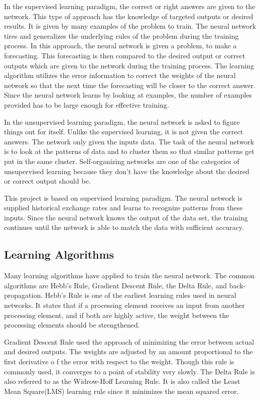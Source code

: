In the supervised learning paradigm, the correct or right answers are given to the network. This type of approach  has the  knowledge of targeted outputs or desired results. It is given by many examples of the problem to train. The neural network tires and generalizes the underlying rules of the problem  during the training process. In this approach, the neural network is given a problem, to make a forecasting. This forecasting is then compared to the desired output or correct outputs which are given to the network during the training process. The learning algorithm utilizes the error information to correct the weights of  the neural network so that the next time the forecasting will be closer to the correct answer. Since the neural network learns by looking at examples, the number of examples provided has to be large enough for effective training. 

In the unsupervised learning paradigm, the neural network is asked to figure things out for itself. Unlike the supervised learning, it is not given the correct answers. The network only given the inputs data.  The task of the neural network is to look at the patterns of data and to cluster them so that similar patterns get put in the same cluster. Self-organizing networks are one of the categories of unsupervised learning because they don't have the knowledge about the desired or correct output should be. 

This project  is based on supervised learning paradigm. The neural network is supplied historical exchange rates and learns to recognize patterns from these inputs. Since the neural network knows the output of the data set, the training continues until the network is able to match the data with sufficient accuracy.

\subsection{Learning Algorithms}
Many learning algorithms have applied to train the neural network. The common algorithms are Hebb’s Rule, Gradient Descent Rule,  the Delta Rule, and back-propagation. Hebb’s Rule  is one of the earliest learning rules used in neural networks. It states that  if a processing element receives an input from another processing element, and if both are highly active, the weight between the processing elements should be strengthened.

Gradient Descent Rule used the approach of  minimizing the error between actual and desired outputs. The weights are adjusted by an amount proportional to the first derivative o f the error with respect to the weight. Though this rule is commonly used, it converges to a point of stability very slowly. The Delta Rule is also referred to as the Widrow-Hoff Learning Rule. It is also called the Least Mean Square(LMS) learning rule since it minimizes the mean squared error.

